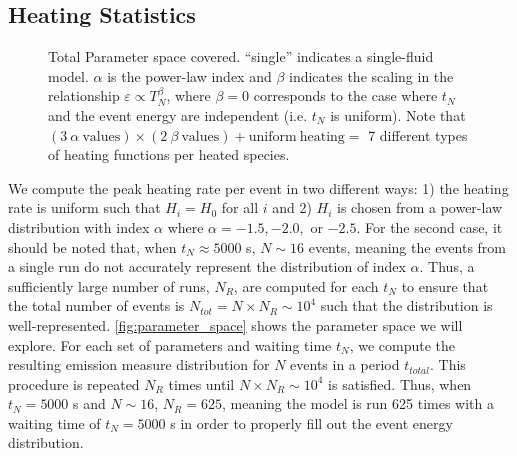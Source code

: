 \documentclass[preprint,linenumbers]{aastex}
\begin{document}
	\subsection{Heating Statistics}
	\label{subsec:heating_stats}
	\begin{figure}
		\centering
		
		\caption{Total Parameter space covered. ``single'' indicates a single-fluid model. $\alpha$ is the power-law index and $\beta$ indicates the scaling in the relationship $\varepsilon\propto T_N^{\beta}$, where $\beta=0$ corresponds to the case where $t_N$ and the event energy are independent (i.e. $t_N$ is uniform). Note that $(3~\alpha~\mathrm{values})\times(2~\beta~\mathrm{values})+\mathrm{uniform~heating}=$ 7 different types of heating functions per heated species.}
		\label{fig:parameter_space}
	\end{figure}
	\par We compute the peak heating rate per event in two different ways: 1) the heating rate is uniform such that $H_i=H_0$ for all $i$ and 2) $H_i$ is chosen from a power-law distribution with index $\alpha$ where $\alpha=-1.5,-2.0,$ or $-2.5$. For the second case, it should be noted that, when $t_N\approx5000$ s, $N\sim16$ events, meaning the events from a single run do not accurately represent the distribution of index $\alpha$. Thus, a sufficiently large number of runs, $N_{R}$, are computed for each $t_N$ to ensure that the total number of events is $N_{tot}=N\times N_{R}\sim10^4$ such that the distribution is well-represented. \autoref{fig:parameter_space} shows the parameter space we will explore. For each set of parameters and waiting time $t_N$, we compute the resulting emission measure distribution for $N$ events in a period $t_{total}$. This procedure is repeated $N_R$ times until $N\times N_R\sim10^4$ is satisfied. Thus, when $t_N=5000$ s and $N\sim16$, $N_R=625$, meaning the model is run 625 times with a waiting time of $t_N=5000$ s in order to properly fill out the event energy distribution.
\end{document}

